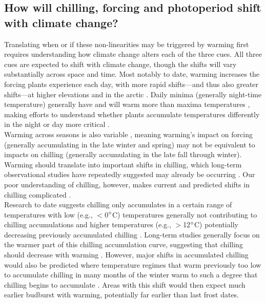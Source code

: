 \documentclass[11pt,letter]{article}
\begin{document}
\subsection{How will chilling, forcing and photoperiod shift with climate change?}
Translating when or if these non-linearities may be triggered by warming first requires understanding how climate change alters each of the three cues. All three cues are expected to shift with climate change, though the shifts will vary substantially across space and time. Most notably to date, warming increases the forcing plants experience each day, with more rapid shifts---and thus also greater shifts---at higher elevations and in the arctic \citep{IPCC:2014sm}. Daily minima (generally night-time temperature) generally have and will warm more than maxima temperatures \citep[though this effect varies spatially][]{Alexander:2006qy}, making efforts to understand whether plants accumulate temperatures differently in the night or day more critical \citep{prasad2008,shen2018}. \\ 

Warming across seasons is also variable \citep{Alexander:2006qy}, meaning warming's impact on forcing (generally accumulating in the late winter and spring) may not be equivalent to impacts on chilling (generally accumulating in the late fall through winter). Warming should translate into important shifts in chilling, which long-term observational studies have repeatedly suggested may already be occurring \citep{fu2015,piao2017}.  Our poor understanding of chilling, however, makes current and predicted shifts in chilling complicated \citep{chuine2016}. \\

Research to date suggests chilling only accumulates in a certain range of temperatures with low (e.g., $<$0$\degree$C) temperatures generally not contributing to chilling accumulations and higher temperatures (e.g., $>$12$\degree$C) potentially decreasing previously accumulated chilling \citep[see Fig. \ref{fig:chilling} and][]{richardson1974,fishman1987}. Long-term studies generally focus on the warmer part of this chilling accumulation curve, suggesting that chilling should decrease with warming \citep{fu2015,piao2017,gauzere2019}.  However, major shifts in accumulated chilling would also be predicted where temperature regimes  that warm previously too low to accumulate chilling in many months of the winter warm to such a degree that chilling begins to accumulate \citep{guy2014}. Areas with this shift would then expect much earlier budburst with warming, potentially far earlier than last frost dates. \\ %
\end{document}

